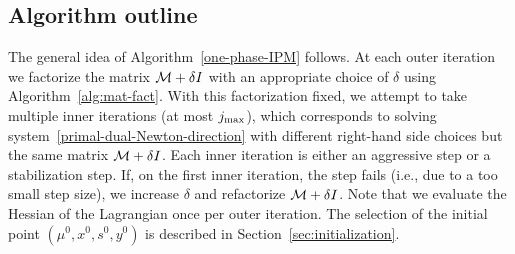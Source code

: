 \documentclass{article}
\begin{document}
\subsection{Algorithm outline}\label{sec:practical-alg-outline}

The general idea of Algorithm~\ref{one-phase-IPM} follows. At each outer iteration we factorize the matrix $\mathcal{M} + \delta I$ with an appropriate choice of $\delta$ using Algorithm~\ref{alg:mat-fact}. With this factorization fixed, we attempt to take multiple inner iterations (at most $j_{\max}$), which corresponds to solving system~\eqref{primal-dual-Newton-direction} with different right-hand side choices but the same matrix $\mathcal{M} + \delta I$. Each inner iteration is either an aggressive step or a stabilization step. If, on the first inner iteration, the step fails (i.e., due to a too small step size), we increase $\delta$ and refactorize $\mathcal{M} + \delta I$. Note that we evaluate the Hessian of the Lagrangian once per outer iteration. The selection of the initial point $(\mu^{0}, x^{0}, s^{0}, y^{0})$ is described in Section~\ref{sec:initialization}.

\end{document}
